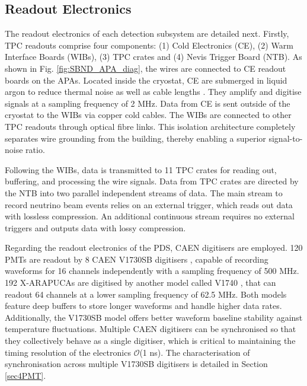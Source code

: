 \subsection{Readout Electronics}
\label{sec:readout}

The readout electronics of each detection subsystem are detailed next.
Firstly, TPC readouts comprise four components: (1) Cold Electronics (CE), (2) Warm Interface Boards (WIBs), (3) TPC crates and (4) Nevis Trigger Board (NTB).%
As shown in Fig. \ref{fig:SBND_APA_diag}, the wires are connected to CE readout boards on the APAs.
Located inside the cryostat, CE are submerged in liquid argon to reduce thermal noise as well as cable lengths \cite{SBND_CE}.
They amplify and digitise signals at a sampling frequency of 2 MHz. 
Data from CE is sent outside of the cryostat to the WIBs via copper cold cables.              
The WIBs are connected to other TPC readouts through optical fibre links.
This isolation architecture completely separates wire grounding from the building, thereby enabling a superior signal-to-noise ratio.

Following the WIBs, data is transmitted to 11 TPC crates for reading out, buffering, and processing the wire signals. 
Data from TPC crates are directed by the NTB into two parallel independent streams of data.
The main stream to record neutrino beam events relies on an external trigger, which reads out data with lossless compression.
An additional continuous stream requires no external triggers and outputs data with lossy compression. 

Regarding the readout electronics of the PDS, CAEN digitisers are employed. %
120 PMTs are readout by 8 CAEN V1730SB digitisers \cite{caen1730}, capable of recording waveforms for 16 channels independently with a sampling frequency of 500 MHz.
192 X-ARAPUCAs are digitised by another model called V1740 \cite{caen1740}, that can readout 64 channels at a lower sampling frequency of 62.5 MHz.
Both models feature deep buffers to store longer waveforms and handle higher data rates.
Additionally, the V1730SB model offers better waveform baseline stability against temperature fluctuations.
Multiple CAEN digitisers can be synchronised so that they collectively behave as a single digitiser, which is critical to maintaining the timing resolution of the electronics $\mathcal{O}$(1 ns).
The characterisation of synchronisation across multiple V1730SB digitisers is detailed in Section \ref{sec4PMT}.


